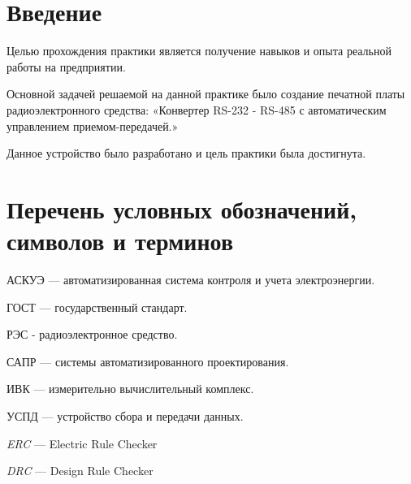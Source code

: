 \tableofcontents
\newpage

\section*{Введение}

Целью прохождения практики является получение
навыков и опыта реальной работы на предприятии.

Основной задачей решаемой на данной практике было
создание печатной платы радиоэлектронного средства:
«Конвертер RS-232 - RS-485 с автоматическим управлением приемом-передачей.»

Данное устройство было разработано и цель практики была достигнута.

\newpage

\section*{Перечень условных обозначений,\\
  символов и терминов}

АСКУЭ — автоматизированная система контроля и учета электроэнергии.

ГОСТ — государственный стандарт.

РЭС - радиоэлектронное средство.

САПР — системы автоматизированного проектирования.

ИВК — измерительно вычислительный комплекс.

УСПД — устройство сбора и передачи данных.

\textit{ERC} — Electric Rule Checker

\textit{DRC} — Design Rule Checker

\newpage

